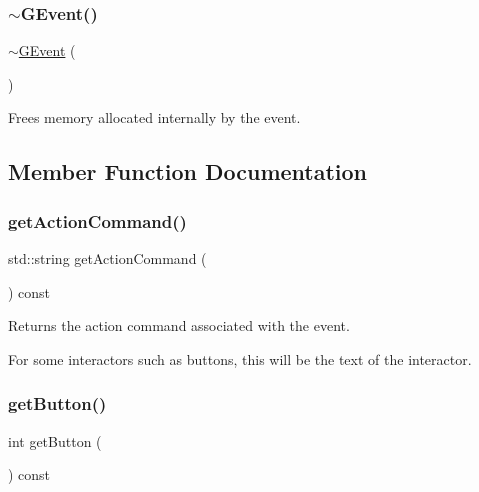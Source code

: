 \mbox{\label{classGEvent_a294ad1d22669baa2bae04f3d75eb183c}} 
\subsubsection{\texorpdfstring{$\sim$\+G\+Event()}{~GEvent()}}
{\footnotesize\ttfamily $\sim$\mbox{\hyperlink{classGEvent}{G\+Event}} (\begin{DoxyParamCaption}{ }\end{DoxyParamCaption})\hspace{0.3cm}{\ttfamily [virtual]}}



Frees memory allocated internally by the event. 



\subsection{Member Function Documentation}
\mbox{\label{classGEvent_a94eb4276000c4fdfb508ce9e6317a82a}} 
\subsubsection{\texorpdfstring{get\+Action\+Command()}{getActionCommand()}}
{\footnotesize\ttfamily std\+::string get\+Action\+Command (\begin{DoxyParamCaption}{ }\end{DoxyParamCaption}) const\hspace{0.3cm}{\ttfamily [virtual]}}



Returns the action command associated with the event. 

For some interactors such as buttons, this will be the text of the interactor. \mbox{\label{classGEvent_a206a3a5ac61ccb2de0208401739c5425}} 
\subsubsection{\texorpdfstring{get\+Button()}{getButton()}}
{\footnotesize\ttfamily int get\+Button (\begin{DoxyParamCaption}{ }\end{DoxyParamCaption}) const\hspace{0.3cm}{\ttfamily [virtual]}}



